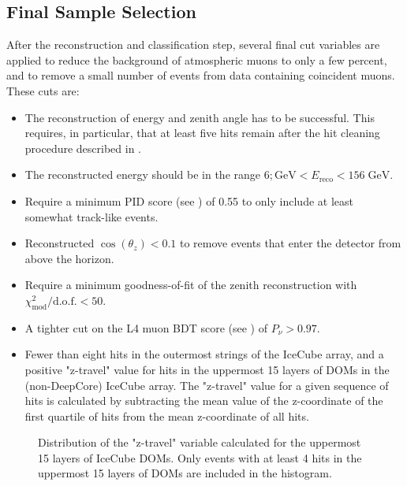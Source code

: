 \subsection{Final Sample Selection}

After the reconstruction and classification step, several final cut variables are applied to reduce the background of atmospheric muons to only a few percent, and to remove a small number of events from data containing coincident muons. These cuts are:
\begin{itemize}
    \item The reconstruction of energy and zenith angle has to be successful. This requires, in particular, that at least five hits remain after the hit cleaning procedure described in .
    \item The reconstructed energy should be in the range $6;\mathrm{GeV} < E_{\mathrm{reco}} < 156\;\mathrm{GeV}$.
    \item Require a minimum PID score (see ) of 0.55 to only include at least somewhat track-like events.
    \item Reconstructed $\cos(\theta_z) < 0.1$ to remove events that enter the detector from above the horizon.
    \item Require a minimum goodness-of-fit of the zenith reconstruction with $\chi^2_{\mathrm{mod}}/\mathrm{d.o.f.} < 50$.
    \item A tighter cut on the L4 muon BDT score (see ) of $P_\nu > 0.97$.
    \item Fewer than eight hits in the outermost strings of the IceCube array, and a positive "z-travel" value for hits in the uppermost 15 layers of DOMs in the (non-DeepCore) IceCube array. The "z-travel" value for a given sequence of hits is calculated by subtracting the mean value of the z-coordinate of the first quartile of hits from the mean z-coordinate of all hits. 
\end{itemize}

\begin{figure}
    \centering
    
    \caption{Distribution of the "z-travel" variable calculated for the uppermost 15 layers of IceCube DOMs. Only events with at least 4 hits in the uppermost 15 layers of DOMs are included in the histogram.}
    \label{fig:z_travel_distribution}
\end{figure}

%     



